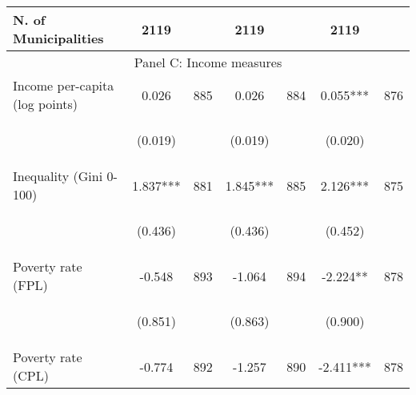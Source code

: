 \begin{tabular}{lcccccc}
N. of Municipalities  &   2119   &  &  2119    & &  2119  &    \\

\hline		

\multicolumn{7}{c}{Panel C: Income measures} \\

Income per-capita (log points)    &  0.026   &  885  &   0.026  &  884 &  0.055***  &  876   \\

\vspace{4pt} &  \begin{footnotesize}(0.019)\end{footnotesize}   & &
			    \begin{footnotesize}(0.019)\end{footnotesize}   & &
			    \begin{footnotesize}(0.020)\end{footnotesize}   &
			     \\          


Inequality (Gini 0-100)     &  1.837***   &  881  &   1.845***  &  885 &  2.126***  &  875   \\

\vspace{4pt} &  \begin{footnotesize}(0.436)\end{footnotesize}   & &
			    \begin{footnotesize}(0.436)\end{footnotesize}   & &
			    \begin{footnotesize}(0.452)\end{footnotesize}   &
			     \\


Poverty rate (FPL)     &  -0.548   &  893  &   -1.064  &  894 &  -2.224**  &  878   \\

\vspace{4pt} &  \begin{footnotesize}(0.851)\end{footnotesize}   & &
			    \begin{footnotesize}(0.863)\end{footnotesize}   & &
			    \begin{footnotesize}(0.900)\end{footnotesize}   &
			     \\
 
Poverty rate (CPL)    &  -0.774   &  892  &   -1.257  &  890 &  -2.411***  &  878   \\


\end{tabular}
